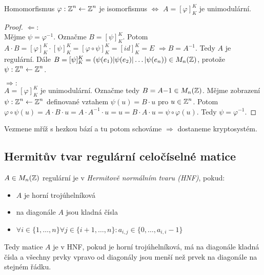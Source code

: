 \begin{claim}
    Homomorfismus $\varphi: \operatorname{\mathbb{Z}}^n \leftarrow \operatorname{\mathbb{Z}}^n$ je isomorfismus $\Leftrightarrow$ $A = [\varphi]^K_K$ je unimodulární.
\end{claim}
\begin{proof}
    $\Leftarrow:$\\
    Mějme $\psi = \varphi^{-1}$. Označme $B = [\psi]^K_K$. Potom $A \cdot B = [\varphi]^K_K \cdot [\psi]^K_K = [\varphi \circ \psi]^K_K = [id]^K_K = E$
    $\Rightarrow B = A^{-1}$. Tedy $A$ je regulární. Dále $B = [\psi]^K_K = (\psi(e_1)|\psi(e_2)| \dots | \psi(e_n)) \in M_n(\operatorname{\mathbb{Z}})$, protože $\psi: \operatorname{\mathbb{Z}}^n \leftarrow \operatorname{\mathbb{Z}}^n$.

    $\Rightarrow:$\\
    $A = [\varphi]^K_K$ je unimodulární. Označme tedy $B = A{-1} \in M_n(\operatorname{\mathbb{Z}})$. Mějme zobrazení $\psi: \operatorname{\mathbb{Z}}^n \leftarrow \operatorname{\mathbb{Z}}^n$ definované vztahem $\psi(u) = B\cdot u$ pro $u \in \operatorname{\mathbb{Z}}^n$. 
    Potom $\varphi \circ \psi (u) = A\cdot B\cdot u = A\cdot A^{-1}\cdot u = u = B\cdot A\cdot u = \psi \circ \varphi (u)$. Tedy $\psi = \varphi^{-1}$. 
\end{proof}

\begin{note}
    Vezmene mříž s hezkou bází a tu potom schováme $\Rightarrow$ dostaneme kryptosystém.
\end{note}

\subsection{Hermitův tvar regulární celočíselné matice}
\begin{definition}
    $A \in M_n(\operatorname{\mathbb{Z}})$ regulární je v \emph{Hermitově normálním tvaru (HNF)}, pokud:
    \begin{itemize}
        \item $A$ je horní trojúhelníková
        \item na diagonále $A$ jsou kladná čísla
        \item $\forall i \in \{1, \dots, n\} \forall j \in \{i+1, \dots, n\}: a_{i,j} \in \{0, \dots, a_{i,i}-1\}$
    \end{itemize}
\end{definition}
\begin{note}
    Tedy matice $A$ je v HNF, pokud je horní trojúhelníková, má na diagonále kladná čísla a všechny prvky vpravo od diagonály jsou menší než prvek na diagonále na stejném řádku.
\end{note}

